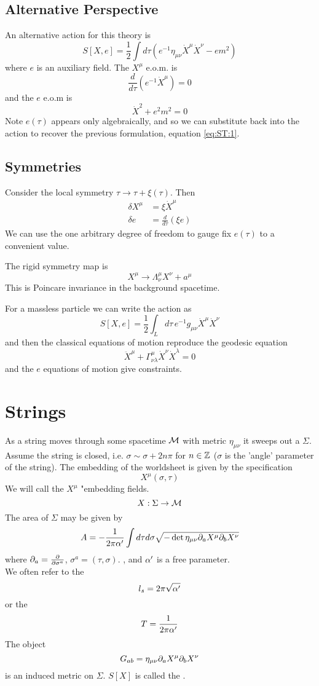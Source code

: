 \documentclass{article}
\begin{document}
\subsection{Alternative Perspective}
An alternative action for this theory is 
\[
S[X,e]=\frac{1}{2} \int d\tau (e^{-1} \eta_{\mu\nu} \dot{X}^\mu \dot{X}^\nu - em^2 )
\]
where $e$ is an auxiliary field. The $X^\mu$ e.o.m. is 
\[
\frac{d}{d\tau}(e^{-1} \dot{X}^\mu ) = 0 
\]
and the $e$ e.o.m is 
\[
\dot{X}^2 + e^2m^2=0
\]
Note $e(\tau)$ appears only algebraically, and so we can substitute back into the action to recover the previous formulation, equation \ref{eq:ST:1}. \\

\subsection{Symmetries}
Consider the local symmetry $\tau \to \tau + \xi(\tau)$. Then 
\begin{align}
    \delta X^\mu &= \xi \dot{X}^\mu \\
    \delta e &= \frac{d}{d\tau}(\xi e) 
\end{align}
We can use the one arbitrary degree of freedom to gauge fix $e(\tau)$ to a convenient value. 

\begin{definition}
The rigid symmetry map is 
\[
X^\mu \to \Lambda^\mu_\nu X^\nu + a^\mu
\]
This is Poincare invariance in the background spacetime. \end{definition}
For a massless particle we can write the action as 
\[
S[X,e] = \frac{1}{2} \int_L d\tau \, e^{-1} g_{\mu\nu} \dot{X}^\mu \dot{X}^\nu
\]
and then the classical equations of motion reproduce the geodesic equation 
\[
\ddot{X}^\mu + \Gamma^{\mu}_{\nu\lambda} \dot{X}^\nu \dot{X}^\lambda = 0
\]
and the $e$ equations of motion give constraints. 

\section{Strings}
As a string moves through some spacetime $\mathcal{M}$ with metric $\eta_{\mu\nu}$ it sweeps out a  $\Sigma$. Assume the string is closed, i.e. $\sigma \sim \sigma+2n\pi$ for $n\in\mathbb{Z}$ ($\sigma$ is the 'angle' parameter of the string). The embedding of the worldsheet is given by the specification 
\[
X^\mu (\sigma,\tau)
\]
We will call the $X^\mu$ "embedding fields. 
\[
X : \Sigma \to \mathcal{M}
\]
The area of $\Sigma$ may be given by 
\[
A = -\frac{1}{2\pi \alpha^\prime} \int d\tau d\sigma \sqrt{-\det{\eta_{\mu\nu}\partial_a X^\mu \partial_b X^\nu}}
\]
where $\partial_a = \frac{\partial}{\partial\sigma^a}$, $\sigma^a = (\tau, \sigma)$. , and $\alpha^\prime$ is a free parameter. \\
We often refer to the  
\[
l_s = 2 \pi \sqrt{\alpha^\prime}
\]
or the  
\[
T = \frac{1}{2\pi \alpha^\prime}
\]
The object 
\[
G_{ab} = \eta_{\mu\nu}\partial_a X^\mu \partial_b X^\nu
\]
is an induced metric on $\Sigma$. $S[X]$ is called the .
\end{document}
